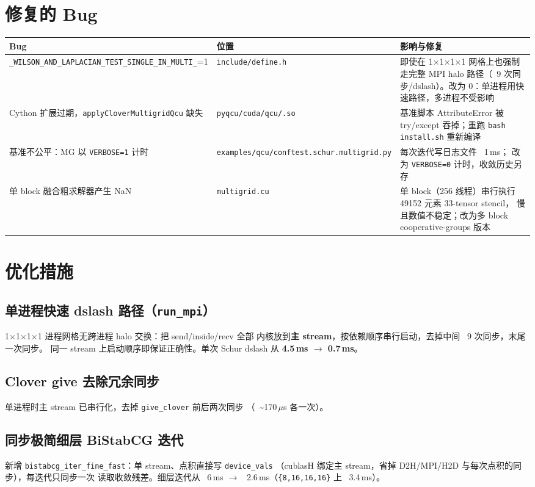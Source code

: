 \documentclass[11pt,a4paper]{article}
\begin{document}
\section{修复的 Bug}
\label{sec:bugs}

\begin{longtable}{p{4.5cm}p{4cm}p{6cm}}
\toprule
Bug & 位置 & 影响与修复 \\
\midrule
\endhead
\texttt{\_WILSON\_AND\_LAPLACIAN\_TEST\_SINGLE\_IN\_MULTI\_}=1 &
\texttt{include/define.h} & 即使在 1$\times$1$\times$1$\times$1 网格上也强制走完整 MPI
halo 路径（~9 次同步/dslash）。改为 0：单进程用快速路径，多进程不受影响 \\
Cython 扩展过期，\texttt{applyCloverMultigridQcu} 缺失 &
\texttt{pyqcu/cuda/qcu/\*.so} & 基准脚本 AttributeError 被 try/except 吞掉；重跑
\texttt{bash install.sh} 重新编译 \\
基准不公平：MG 以 \texttt{VERBOSE=1} 计时 &
\texttt{examples/qcu/conftest.schur.multigrid.py} & 每次迭代写日志文件 ~1\,ms；
改为 \texttt{VERBOSE=0} 计时，收敛历史另存 \\
单 block 融合粗求解器产生 NaN &
\texttt{multigrid.cu} & 单 block（256 线程）串行执行 49152 元素 33-tensor stencil，
慢且数值不稳定；改为多 block cooperative-groups 版本 \\
\bottomrule
\end{longtable}

\section{优化措施}
\label{sec:opt}

\subsection{单进程快速 dslash 路径（\texttt{run\_mpi}）}
\label{sec:opt-single}
1$\times$1$\times$1$\times$1 进程网格无跨进程 halo 交换：把 send/inside/recv 全部
内核放到\textbf{主 stream}，按依赖顺序串行启动，去掉中间 ~9 次同步，末尾一次同步。
同一 stream 上启动顺序即保证正确性。单次 Schur dslash 从 \textbf{4.5\,ms $\to$ 0.7\,ms}。

\subsection{Clover give 去除冗余同步}
\label{sec:opt-clover}
单进程时主 stream 已串行化，去掉 \texttt{give\_clover} 前后两次同步
（~\textasciitilde170\,$\mu$s 各一次）。

\subsection{同步极简细层 BiStabCG 迭代}
\label{sec:opt-fine}
新增 \texttt{bistabcg\_iter\_fine\_fast}：单 stream、点积直接写 \texttt{device\_vals}
（cublasH 绑定主 stream，省掉 D2H/MPI/H2D 与每次点积的同步），每迭代只同步一次
读取收敛残差。细层迭代从 ~6\,ms $\to$ ~2.6\,ms（\texttt{\{8,16,16,16\}} 上 ~3.4\,ms）。
\end{document}
